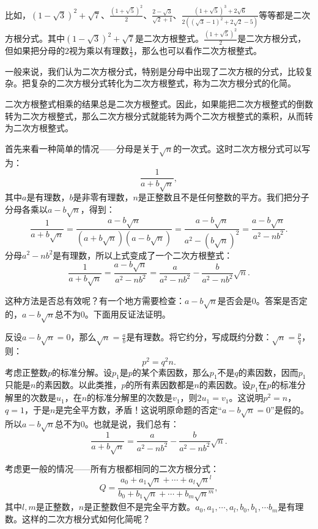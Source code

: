 \documentclass[12pt,UTF8]{ctexbook}
\begin{document}
比如，$\displaystyle (1 - \sqrt{3})^2 + \sqrt{7}$、$\displaystyle \frac{(1+\sqrt{5})^2}{2}$、$\displaystyle \frac{2 - \sqrt{3}}{\sqrt{2} + 1}$、$\displaystyle \frac{(1 + \sqrt{5})^3 + 2\sqrt{6}}{2((\sqrt{3} - 1)^2 + 2\sqrt{2} - 5)}$等等都是二次方根分式。其中$\displaystyle (1 - \sqrt{3})^2 + \sqrt{7}$是二次方根整式。$\displaystyle \frac{(1+\sqrt{5})^2}{2}$是二次方根分式，但如果把分母的$2$视为乘以有理数$\frac{1}{2}$，那么也可以看作二次方根整式。

一般来说，我们认为二次方根分式，特别是分母中出现了二次方根的分式，比较复杂。把复杂的二次方根分式转化为二次方根整式，称为二次方根分式的化简。

二次方根整式相乘的结果总是二次方根整式。因此，如果能把二次方根整式的倒数转为二次方根整式，那么二次方根分式就能转为两个二次方根整式的乘积，从而转为二次方根整式。

首先来看一种简单的情况——分母是关于$\sqrt{n}$的一次式。这时二次方根分式可以写为：
$$ \frac{1}{a + b\sqrt{n}} ,$$
其中$a$是有理数，$b$是非零有理数，$n$是正整数且不是任何整数的平方。我们把分子分母各乘以$a - b\sqrt{n}$，得到：
$$ \frac{1}{a + b\sqrt{n}} = \frac{a - b\sqrt{n}}{(a + b\sqrt{n})(a - b\sqrt{n})} = \frac{a - b\sqrt{n}}{a^2 - (b\sqrt{n})^2} = \frac{a - b\sqrt{n}}{a^2 - nb^2}.$$
分母$a^2 - nb^2$是有理数，所以上式变成了一个二次方根整式：
$$ \frac{1}{a + b\sqrt{n}} = \frac{a - b\sqrt{n}}{a^2 - nb^2} = \frac{a}{a^2 - nb^2} - \frac{b}{a^2 - nb^2}\sqrt{n}.$$

这种方法是否总有效呢？有一个地方需要检查：$a - b\sqrt{n}$是否会是$0$。答案是否定的，$a - b\sqrt{n}$总不为$0$。下面用反证法证明。

反设$a - b\sqrt{n}=0$，那么$\displaystyle\sqrt{n} = \frac{a}{b}$是有理数。将它约分，写成既约分数：$\displaystyle\sqrt{n} = \frac{p}{q}$，则：
$$ p^2 = q^2n.$$
考虑正整数$p$的标准分解。设$p_1$是$p$的某个素因数，那么$p_1$不是$q$的素因数，因而$p_1$只能是$n$的素因数。以此类推，$p$的所有素因数都是$n$的素因数。设$p_1$在$p$的标准分解里的次数是$u_1$，在$n$的标准分解里的次数是$v_1$，则$2u_1=v_1$。这说明$p^2 = n$，$q=1$，于是$n$是完全平方数，矛盾！这说明原命题的否定“$a - b\sqrt{n}=0$”是假的。所以$a - b\sqrt{n}$总不为$0$。也就是说，我们总有：
$$ \frac{1}{a + b\sqrt{n}} = \frac{a}{a^2 - nb^2} - \frac{b}{a^2 - nb^2}\sqrt{n}.$$

考虑更一般的情况——所有方根都相同的二次方根分式：
$$ Q = \frac{a_0 + a_1\sqrt{n} + \cdots + a_l \sqrt{n}^l}{b_0 + b_1\sqrt{n} + \cdots + b_m \sqrt{n}^m}, $$
其中$l,m$是正整数，$n$是正整数但不是完全平方数。$a_0, a_1, \cdots, a_l, b_0, b_1,\cdots b_m$是有理数。这样的二次方根分式如何化简呢？
\end{document}

